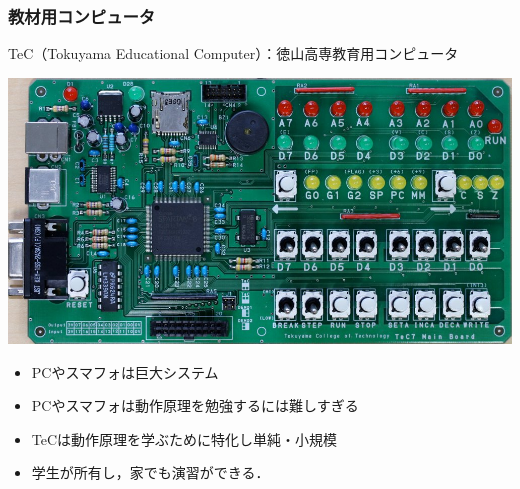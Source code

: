 \documentclass{beamer}                 %
\begin{document}
\begin{frame}
  \frametitle{教材用コンピュータ}
  TeC（Tokuyama Educational Computer）：徳山高専教育用コンピュータ

  \begin{center}
    \includegraphics[scale=0.2]{../Img/TeC7.jpg}
  \end{center}

  \begin{itemize}
  \item PCやスマフォは巨大システム
  \item PCやスマフォは動作原理を勉強するには難しすぎる
  \item TeCは動作原理を学ぶために特化し単純・小規模
  \item 学生が所有し，家でも演習ができる．
  \end{itemize}
\end{frame}
\end{document}
